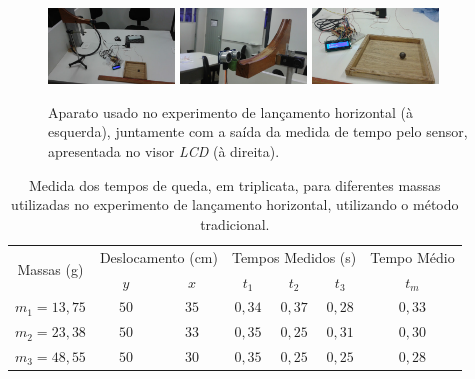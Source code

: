 \documentclass[11pt,a4paper]{article}
\begin{document}
\begin{figure}[!hbt]
\centering
\includegraphics[width=0.3\textwidth]{figs/aparato2.jpg}\hspace{2mm}
\includegraphics[width=0.3\textwidth]{figs/lancador1.jpg}\hspace{2mm}
\includegraphics[width=0.3\textwidth]{figs/quadro1.jpg}
\caption{Aparato usado no experimento de lançamento horizontal (à esquerda), juntamente com a saída da medida de tempo pelo sensor, apresentada no visor \textit{LCD} (à direita).}
\label{fig:aparato_lancamento}
\end{figure}




\begin{table}[!hbt]
\centering
\begin{tabular}{ccccccc}
\toprule
\multirow{2}{*}{Massas (g)} & \multicolumn{2}{c}{Deslocamento (cm)} & \multicolumn{3}{c}{Tempos Medidos (s)} & Tempo Médio\\
\cmidrule(r){2-7}
& $y$ & $x$ & $t_1$ & $t_2$ & $t_3$ & $t_m$ \\
\midrule
$m_1 = 13,75$ & $50$ & $35$ & $0,34$ & $0,37$ & $0,28$ & $0,33$ \\
$m_2 = 23,38$ & $50$ & $33$ & $0,35$ & $0,25$ & $0,31$ & $0,30$ \\
$m_3 = 48,55$ & $50$ & $30$ & $0,35$ & $0,25$ & $0,25$ & $0,28$ \\
\bottomrule
\end{tabular}
\caption{Medida dos tempos de queda, em triplicata, para diferentes massas utilizadas no experimento de lançamento horizontal, utilizando o método tradicional.}
\label{tab:lancamento_tradicional}
\end{table}
\end{document}

